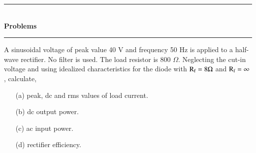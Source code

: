 \begin{center}
\rule{4cm}{1pt}\\
{\bf\Large Problems}\\[-3pt]
\rule{4cm}{1pt}
\end{center}

\begin{problem}\label{prob1.5}
A sinusoidal voltage of peak value 40 V and frequency 50 Hz is applied to a half-wave rectifier. No filter is used. The load resistor is 800 $\Omega$. Neglecting the cut-in voltage and using idealized characteristics for the diode with $\textrm{R}_{\textrm{f}}=8\Omega$ and $\textrm{R}_{\textrm{f}}=\infty$, calculate,
\begin{itemize}
\item[(a)] peak, dc and rms values of load current.

\item[(b)] dc output power.

\item[(c)] ac input power.

\item[(d)] rectifier efficiency.
\end{itemize}
\end{problem}

